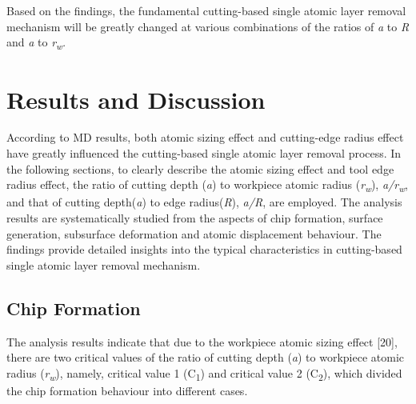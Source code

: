 \documentclass{article}
\begin{document}
Based on the findings, the fundamental cutting-based single atomic layer removal mechanism will be greatly changed at various combinations of the ratios of \emph{a} to \emph{R} and \emph{a} to \emph{r}\textsubscript{\emph{w}}\emph{.}

\section*{Results and Discussion}

According to MD results, both atomic sizing effect and cutting-edge radius effect have greatly influenced the cutting-based single atomic layer removal process. In the following sections, to clearly describe the atomic sizing effect and tool edge radius effect, the ratio of cutting depth (\emph{a}) to workpiece atomic radius (\emph{r}\textsubscript{\emph{w}}), \emph{a/r}\textsubscript{\emph{w}}, and that of cutting depth(\emph{a}) to edge radius(\emph{R}), \emph{a/R}, are employed. The analysis results are systematically studied from the aspects of chip formation, surface generation, subsurface deformation and atomic displacement behaviour. The findings provide detailed insights into the typical characteristics in cutting-based single atomic layer removal mechanism.

\subsection*{Chip Formation}

The analysis results indicate that due to the workpiece atomic sizing effect [20], there are two critical values of the ratio of cutting depth (\emph{a}) to workpiece atomic radius (\emph{r}\textsubscript{\emph{w}}), namely, critical value 1 (C\textsubscript{1}) and critical value 2 (C\textsubscript{2}), which divided the chip formation behaviour into different cases.
\end{document}
